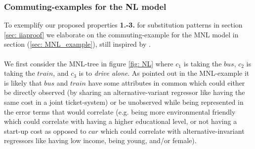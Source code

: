 

\subsubsection{Commuting-examples for the NL model}
\label{sec: NL_example}
To exemplify our proposed properties \textbf{1.-3.} for substitution patterns in section \ref{sec: iiaproof} we elaborate on the commuting-example for the MNL model in section (\ref{sec: MNL_example}), still inspired by \citet{koppelman_self_2006}.
\\ \\
We first consider the MNL-tree in figure \ref{fig: NL} where $c_1$ is taking the $bus$, $c_2$ is taking the $train$, and $c_3$ is to \textit{drive alone}. As pointed out in the MNL-example it is likely that $bus$ and $train$ have some attributes in common which could either be directly observed (by sharing an alternative-variant regressor like having the same cost in a joint ticket-system) or be unobserved while being represented in the error terms that would correlate (e.g. being more environmental friendly which could correlate with having a higher educational level, or not having a start-up cost as opposed to $car$ which could correlate with alternative-invariant regressors like having low income, being young, and/or female).

